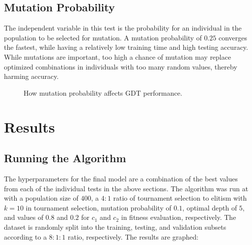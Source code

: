 \documentclass[12pt]{article}
\begin{document}
\subsection{Mutation Probability}

The independent variable in this test is the probability for an individual in the population to be selected for mutation. A mutation probability of $0.25$ converges the fastest, while having a relatively low training time and high testing accuracy. While mutations are important, too high a chance of mutation may replace optimized combinations in individuals with too many random values, thereby harming accuracy.

\begin{figure}[H]
    \centering
    \caption{How mutation probability affects GDT performance.}
\end{figure}

\section{Results}

\subsection{Running the Algorithm}

The hyperparameters for the final model are a combination of the best values from each of the individual tests in the above sections. The algorithm was run at with a population size of $400$, a $4:1$ ratio of tournament selection to elitism with $k=10$ in tournament selection, mutation probability of $0.1$, optimal depth of $5$, and values of $0.8$ and $0.2$ for $c_1$ and $c_2$ in fitness evaluation, respectively. The dataset is randomly split into the training, testing, and validation subsets according to a $8:1:1$ ratio, respectively. The results are graphed:
\end{document}
